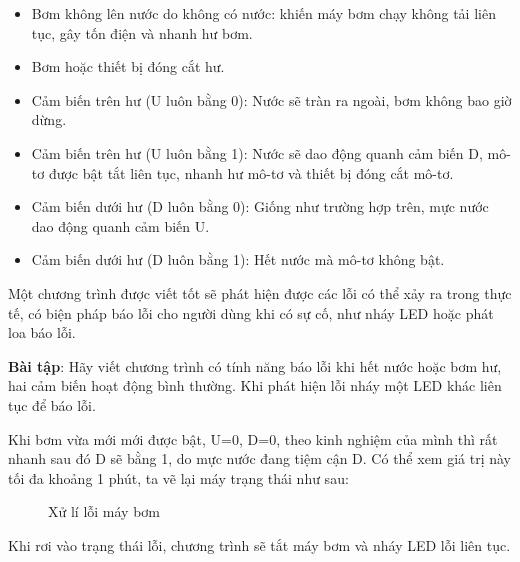\begin{itemize}
    \item Bơm không lên nước do không có nước: khiến máy bơm chạy không tải liên tục, gây tốn điện và nhanh hư bơm.
    \item Bơm hoặc thiết bị đóng cắt hư.
    \item Cảm biến trên hư (U luôn bằng 0): Nước sẽ tràn ra ngoài, bơm không bao giờ dừng.
    \item Cảm biến trên hư (U luôn bằng 1): Nước sẽ dao động quanh cảm biến D, mô-tơ được bật tắt liên tục, nhanh hư mô-tơ và thiết bị đóng cắt mô-tơ.
    \item Cảm biến dưới hư (D luôn bằng 0): Giống như trường hợp trên, mực nước dao động quanh cảm biến U.
    \item Cảm biến dưới hư (D luôn bằng 1): Hết nước mà mô-tơ không bật.  
\end{itemize}

Một chương trình được viết tốt sẽ phát hiện được các lỗi có thể xảy ra trong thực tế, có biện pháp báo lỗi cho người dùng khi có sự cố, như nháy LED hoặc phát loa báo lỗi.

\textbf{Bài tập}: Hãy viết chương trình có tính năng báo lỗi khi hết nước hoặc bơm hư, hai cảm biến hoạt động bình thường. Khi phát hiện lỗi nháy một LED khác liên tục để báo lỗi.

Khi bơm vừa mới mới được bật, U=0, D=0, theo kinh nghiệm của mình thì rất nhanh sau đó D sẽ bằng 1, do mực nước đang tiệm cận D. Có thể xem giá trị này tối đa khoảng 1 phút, ta vẽ lại máy trạng thái như sau:

\begin{figure}[h!]
	\centering
{}
\caption{Xử lí lỗi máy bơm}
\end{figure}

Khi rơi vào trạng thái lỗi, chương trình sẽ tắt máy bơm và nháy LED lỗi liên tục.

